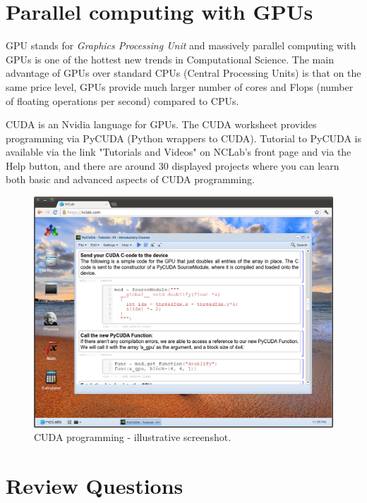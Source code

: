 \documentclass[article,A4,12pt]{llncs}
\begin{document}
\section{Parallel computing with GPUs}

GPU stands for {\em Graphics Processing Unit} and massively parallel computing with GPUs
is one of the hottest new trends in Computational Science. The main advantage 
of GPUs over standard CPUs (Central Processing Units) is that on the same price 
level, GPUs provide much larger number of cores and Flops (number of floating 
operations per second) compared to CPUs.
 
CUDA is an Nvidia language for GPUs. The CUDA worksheet provides programming via 
PyCUDA (Python wrappers to CUDA). Tutorial to PyCUDA is available via the link "Tutorials and Videos" 
on NCLab's front page and via the Help button, and there are around 30 
displayed projects where you can learn both basic and advanced aspects of CUDA
programming. 

\begin{figure}[!ht]
\begin{center}
\includegraphics[width=\textwidth]{img/progr4.png}
\end{center}
\caption{CUDA programming - illustrative screenshot.}
\label{fig:progr4}
\end{figure}
\noindent

\section{Review Questions}
\end{document}
